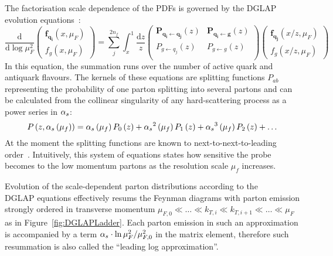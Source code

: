 The factorisation scale dependence of the PDFs is governed by the DGLAP evolution equations~\cite{Altarelli:1977zs,Gribov:1972,Dokshitzer:1977,Balitsky:1978}:
\begin{equation}
\frac{\mathrm{d}}{\mathrm{d}\log{\mu_F^2}}
 \begin{pmatrix}
	\mathbf{f_{q_i}}\left(x,\mu_F\right) \\
	f_g\left(x,\mu_F\right)
 \end{pmatrix} = 
\sum_j^{2n_f}{\int_x^1{\frac{\mathrm{d}z}{z}
 \begin{pmatrix}
  \mathbf{P_{q_i \leftarrow q_j}}\left(z\right) & \mathbf{P_{q_i \leftarrow  g}}\left(z\right) \\
  P_{g \leftarrow q_j}\left(z\right) & P_{g \leftarrow g}\left(z\right) \\
 \end{pmatrix}
 \begin{pmatrix}
	\mathbf{f_{q_j}}\left(x/z,\mu_F\right) \\
	f_g\left(x/z,\mu_F\right)
 \end{pmatrix}
}}
\end{equation}
In this equation, the summation runs over the number of active quark and antiquark flavours. The kernels of these equations are splitting functions $P_{ab}$ representing the probability of one parton splitting into several partons and can be calculated from the collinear singularity of any hard-scattering process as a power series in $\mbox{$\alpha_{s}$}$:
\begin{equation}
P\left(z,\mbox{$\alpha_{s}$}\left(\mu_f\right)\right) = \mbox{$\alpha_{s}$}\left(\mu_f\right) P_0\left(z\right) + \mbox{$\alpha_{s}$}^2\left(\mu_f\right)P_1\left(z\right) + \mbox{$\alpha_{s}$}^3\left(\mu_f\right)P_2\left(z\right) + \ldots
\label{eq:splittingfunc}
\end{equation}
At the moment the splitting functions are known to next-to-next-to-leading order~\cite{Vogt:2004mw,Moch:2004pa}. Intuitively, this system of equations states how sensitive the probe becomes to the low momentum partons as the resolution scale $\mu_f$ increases. %

Evolution of the scale-dependent parton distributions according to the \\DGLAP equations effectively resums the Feynman diagrams with parton emission strongly ordered in transverse momentum $ \mu_{F,0} \ll \ldots \ll k_{T,i} \ll k_{T,i+1} \ll \ldots \ll \mu_F$ as in Figure~\ref{fig:DGLAPLadder}. Each parton emission in such an approximation is accompanied by a term $\mbox{$\alpha_{s}$}\cdot\ln{\mu^2_F/\mu^2_{F,0}}$ in the matrix element, therefore such resummation is also called the ``leading log approximation''.

